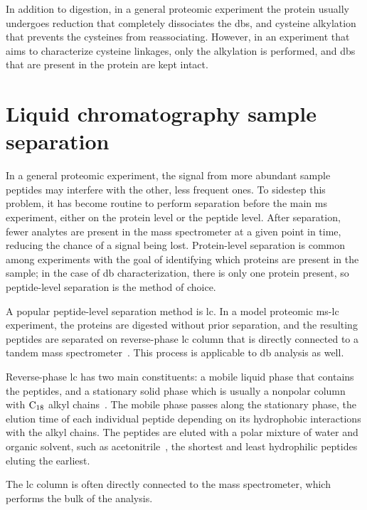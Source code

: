 In addition to digestion, in a general proteomic experiment the protein usually undergoes reduction that completely dissociates the \glspl*{db}, and cysteine alkylation that prevents the cysteines from reassociating. However, in an experiment that aims to characterize cysteine linkages, only the alkylation is performed, and \glspl*{db} that are present in the protein are kept intact.

\section{Liquid chromatography sample separation}\label{sec:lc}

In a general proteomic experiment, the signal from more abundant sample peptides may interfere with the other, less frequent ones. To sidestep this problem, it has become routine to perform separation before the main \gls*{ms} experiment, either on the protein level or the peptide level. After separation, fewer analytes are present in the mass spectrometer at a given point in time, reducing the chance of a signal being lost. Protein-level separation is common among experiments with the goal of identifying which proteins are present in the sample; in the case of \gls*{db} characterization, there is only one protein present, so peptide-level separation is the method of choice.

A popular peptide-level separation method is \gls*{lc}. In a model proteomic \gls*{ms}-\gls*{lc} experiment, the proteins are digested without prior separation, and the resulting peptides are separated on reverse-phase \gls*{lc} column that is directly connected to a tandem mass spectrometer~\cite{washburn2001large}. This process is applicable to \gls*{db} analysis as well.

Reverse-phase \gls*{lc} has two main constituents: a mobile liquid phase that contains the peptides, and a stationary solid phase which is usually a nonpolar column with \(\ce{C18}\) alkyl chains~\cite{chang1976high}. The mobile phase passes along the stationary phase, the elution time of each individual peptide depending on its hydrophobic interactions with the alkyl chains. The peptides are eluted with a polar mixture of water and organic solvent, such as acetonitrile~\cite{frohlich2006proteome}, the shortest and least hydrophilic peptides eluting the earliest.

The \gls*{lc} column is often directly connected to the mass spectrometer, which performs the bulk of the analysis.


